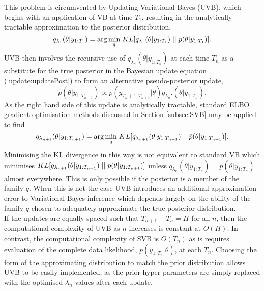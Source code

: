 \documentclass[12pt,a4paper]{article}\usepackage[]{graphicx}\usepackage[]{color}
\begin{document}
This problem is circumvented by Updating Variational Bayes (UVB), which begins with an application of VB at time $T_1$, resulting in the analytically tractable approximation to the posterior distribution,
\begin{equation}
\label{UVB:Time1}
q_{\lambda_1}(\theta | y_{1:T_1}) = \arg \underset{q}{\min} \hspace{1mm} KL[q_{\lambda_1} (\theta | y_{1:T_1}) \hspace{.1cm}||\hspace{.1cm}p(\theta | y_{1:T_1})].
\end{equation}
UVB then involves the recursive use of $q_{\lambda_n}(\theta | y_{1:T_n})$ at each time $T_n$ as a substitute for the true posterior in the Bayesian update equation (\ref{update:updatePost}) to form an alternative pseudo-posterior update,
\begin{equation}
\label{UVB:pHatPosterior}
\hat{p}(\theta |  y_{1:T_{n+1}}) \propto p(y_{T_{n}+1:T_{n+1}} | \theta)q_{\lambda_{n}}.(\theta | y_{1:T_{n}}).
\end{equation}
As the right hand side of this update is analytically tractable, standard ELBO gradient optimisation methods discussed in Section \ref{subsec:SVB} may be applied to find  
\begin{equation}
\label{UVB:TimeNp1}
q_{\lambda_{n+1}}(\theta | y_{1:T_{n+1}}) = \arg \underset{q}{\min} \hspace{1mm} KL[q_{\lambda_{n+1}} (\theta | y_{1:T_{n+1}}) \hspace{.1cm}||\hspace{.1cm}\hat{p}(\theta | y_{1:T_{n+1}})].
\end{equation}
Minimising the KL divergence in this way is not equivalent to standard VB which minimises $KL[q_{\lambda_{n+1}} (\theta | y_{1:T_{n+1}}) \hspace{.1cm}||\hspace{.1cm}p(\theta | y_{1:T_{n+1}})]$ unless $q_{\lambda_{n}}(\theta |  y_{1:T_{n}}) = p(\theta |  y_{1:T_{n}})$ almost everywhere. This is only possible if the posterior is a member of the family $q$. When this is not the case UVB introduces an additional approximation error to Variational Bayes inference which depends largely on the ability of the family $q$ chosen to adequately approximate the true posterior distribution.
\\

If the updates are equally spaced such that $T_{n+1} - T_{n} = H$ for all $n$, then the computational complexity of UVB as $n$ increases is constant at $O(H)$. In contrast, the computational complexity of SVB is $O(T_{n})$ as is requires evaluation of the complete data likelihood, $p(y_{1:T_{n}} | \theta)$, at each $T_{n}$. Choosing the form of the approximating distribution to match the prior distribution allows UVB to be easily implemented, as the prior hyper-parameters are simply replaced with the optimised $\lambda_n$ values after each update.
\\
\end{document}
